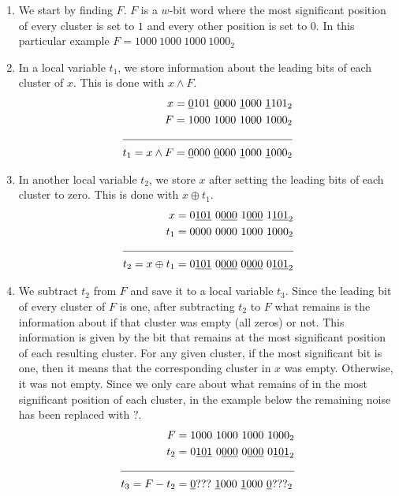 \begin{enumerate}
    \item \label{blt:msb1}
    We start by finding $F$. $F$ is a $w$-bit word where the most significant position of every cluster is set to $1$ and every other position is set to $0$. In this particular example $F = 1000\ 1000\ 1000\ 1000_2$
    
    \item \label{blt:msb2}
    In a local variable $t_1$, we store information about the leading bits of each cluster of $x$. This is done with $x \wedge F$.
    \begin{align*}
                       x &= \underline{0}101\ \underline{0}000\ \underline{1}000\ \underline{1}101_2 \\
                       F &= 1000\ 1000\ 1000\ 1000_2 \\ \cline{1-2} 
        t_1 = x \wedge F &= \underline{0}000\ \underline{0}000\ \underline{1}000\ \underline{1}000_2
    \end{align*}
    
    \item \label{blt:msb3}
    In another local variable $t_2$, we store $x$ after setting the leading bits of each cluster to zero. This is done with $x \oplus t_1$.
    \begin{align*}
                         x &= 0\underline{101}\ 0\underline{000}\ 1\underline{000}\ 1\underline{101}_2 \\
                       t_1 &= 0000\ 0000\ 1000\ 1000_2 \\ \cline{1-2}
        t_2 = x \oplus t_1 &= 0\underline{101}\ 0\underline{000}\ 0\underline{000}\ 0\underline{101}_2
    \end{align*}
    
    \item \label{blt:msb4}
    We subtract $t_2$ from $F$ and save it to a local variable $t_3$. Since the leading bit of every cluster of $F$ is one, after subtracting $t_2$ to $F$ what remains is the information about if that cluster was empty (all zeros) or not. This information is given by the bit that remains at the most significant position of each resulting cluster. For any given cluster, if the most significant bit is one, then it means that the corresponding cluster in $x$ was empty. Otherwise, it was not empty. Since we only care about what remains of in the most significant position of each cluster, in the example below the remaining noise has been replaced with $?$.
    \begin{align*}
                    F &= 1000\ 1000\ 1000\ 1000_2 \\
                  t_2 &= 0\underline{101}\ 0\underline{000}\ 0\underline{000}\ 0\underline{101}_2 \\ \cline{1-2} 
        t_3 = F - t_2 &= \underline{0}???\ \underline{1}000\ \underline{1}000\ \underline{0}???_2
    \end{align*}
    

\end{enumerate}

